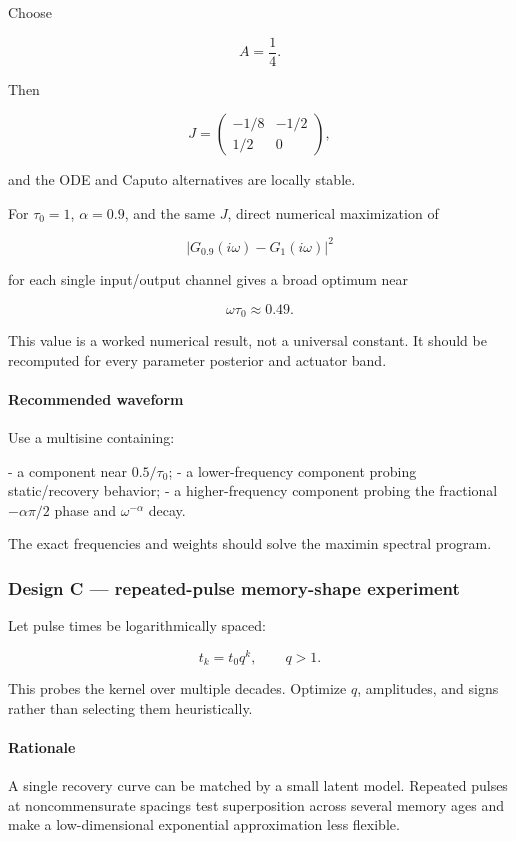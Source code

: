 Choose

\[
A=\frac14.
\]

Then

\[
J=\begin{pmatrix}-1/8&-1/2\\1/2&0\end{pmatrix},
\]

and the ODE and Caputo alternatives are locally stable.

For \(\tau_0=1\), \(\alpha=0.9\), and the same \(J\), direct numerical maximization of

\[
|G_{0.9}(i\omega)-G_1(i\omega)|^2
\]

for each single input/output channel gives a broad optimum near

\[
\boxed{\omega\tau_0\approx0.49.}
\]

This value is a worked numerical result, not a universal constant. It should be recomputed for every parameter posterior and actuator band.

\paragraph{Recommended waveform}

Use a multisine containing:

- a component near \(0.5/\tau_0\);
- a lower-frequency component probing static/recovery behavior;
- a higher-frequency component probing the fractional \(-\alpha\pi/2\) phase and \(\omega^{-\alpha}\) decay.

The exact frequencies and weights should solve the maximin spectral program.

\subsubsection{Design C --- repeated-pulse memory-shape experiment}

Let pulse times be logarithmically spaced:

\[
t_k=t_0q^k,
\qquad q>1.
\]

This probes the kernel over multiple decades. Optimize \(q\), amplitudes, and signs rather than selecting them heuristically.

\paragraph{Rationale}

A single recovery curve can be matched by a small latent model. Repeated pulses at noncommensurate spacings test superposition across several memory ages and make a low-dimensional exponential approximation less flexible.

